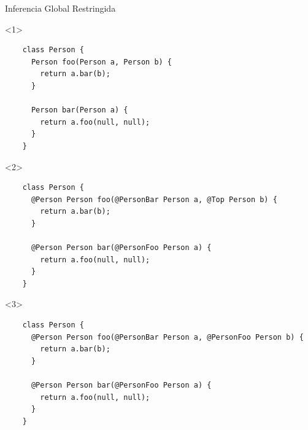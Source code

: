 \documentclass[aspectratio=169,10pt]{beamer}
\begin{document}
\begin{frame}[fragile]{Inferencia Global Restringida}

  \begin{onlyenv}<1>
		\only<2-|handout:0>{\stepcounter{framenumber}}
    \begin{lstlisting}
    class Person {
      Person foo(Person a, Person b) {
        return a.bar(b);
      }

      Person bar(Person a) {
        return a.foo(null, null);
      }
    }
    \end{lstlisting}
  \end{onlyenv}
  \begin{onlyenv}<2>
    \begin{lstlisting}
    class Person {
      @Person Person foo(@PersonBar Person a, @Top Person b) {
        return a.bar(b);
      }

      @Person Person bar(@PersonFoo Person a) {
        return a.foo(null, null);
      }
    }
    \end{lstlisting}
  \end{onlyenv}
    \begin{onlyenv}<3>
    \begin{lstlisting}
    class Person {
      @Person Person foo(@PersonBar Person a, @PersonFoo Person b) {
        return a.bar(b);
      }

      @Person Person bar(@PersonFoo Person a) {
        return a.foo(null, null);
      }
    }
    \end{lstlisting}
  \end{onlyenv}
\end{frame}
\end{document}

